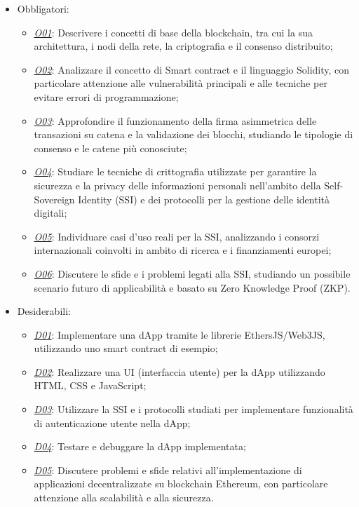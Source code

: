 \begin{itemize}

    \item Obbligatori:
        \begin{itemize}
            \item \underline{\textit{O01}}: Descrivere i concetti di base della blockchain, tra cui la sua architettura, i nodi della rete, la criptografia e il consenso distribuito;
            \item \underline{\textit{O02}}: Analizzare il concetto di Smart contract e il linguaggio Solidity, con particolare attenzione alle vulnerabilità principali e alle tecniche per evitare errori di programmazione;
            \item \underline{\textit{O03}}: Approfondire il funzionamento della firma asimmetrica delle transazioni su catena e la validazione dei blocchi, studiando le tipologie di consenso e le catene più conosciute;
            \item \underline{\textit{O04}}: Studiare le tecniche di crittografia utilizzate per garantire la sicurezza e la privacy delle informazioni personali nell'ambito della Self-Sovereign Identity (SSI) e dei protocolli per la gestione delle identità digitali;
            \item \underline{\textit{O05}}: Individuare casi d'uso reali per la SSI, analizzando i consorzi internazionali coinvolti in ambito di ricerca e i finanziamenti europei;
            \item \underline{\textit{O06}}: Discutere le sfide e i problemi legati alla SSI, studiando un possibile scenario futuro di applicabilità e basato su Zero Knowledge Proof (ZKP).
        \end{itemize}

    \item Desiderabili:
        \begin{itemize}
            \item \underline{\textit{D01}}: Implementare una dApp tramite le librerie EthersJS/Web3JS, utilizzando uno smart contract di esempio;
            \item \underline{\textit{D02}}: Realizzare una UI (interfaccia utente) per la dApp utilizzando HTML, CSS e JavaScript;
            \item \underline{\textit{D03}}: Utilizzare la SSI e i protocolli studiati per implementare funzionalità di autenticazione utente nella dApp;
            \item \underline{\textit{D04}}: Testare e debuggare la dApp implementata;
            \item \underline{\textit{D05}}: Discutere problemi e sfide relativi all'implementazione di applicazioni decentralizzate su blockchain Ethereum, con particolare attenzione alla scalabilità e alla sicurezza.
        \end{itemize}


\end{itemize}
